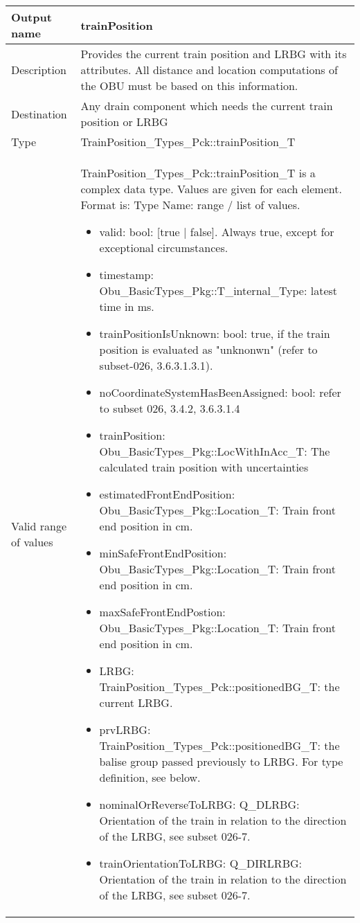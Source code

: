 \begin{longtable}{p{}p{}}
\toprule
Output name				& trainPosition \\
\midrule
Description				& Provides the current train position and LRBG with its attributes. All distance and location computations of the OBU must be based on this information.   \\
\midrule
Destination				& Any drain component which needs the current train position or  LRBG \\ 
\midrule
Type					& TrainPosition\_Types\_Pck::trainPosition\_T \\  
\midrule
Valid range of values	& TrainPosition\_Types\_Pck::trainPosition\_T is a complex data type. Values are given for each element. Format is: Type Name: range / list of values.
\begin{itemize}
\item valid: bool: [true | false]. Always true, except for exceptional circumstances.
\item timestamp: Obu\_BasicTypes\_Pkg::T\_internal\_Type: latest time in ms. 
\item trainPositionIsUnknown: bool: true, if the train position is evaluated as "unknonwn" (refer to subset-026, 3.6.3.1.3.1). 
\item noCoordinateSystemHasBeenAssigned: bool: refer to subset 026, 3.4.2, 3.6.3.1.4
\item trainPosition: Obu\_BasicTypes\_Pkg::LocWithInAcc\_T: The calculated train position with uncertainties
\item estimatedFrontEndPosition: Obu\_BasicTypes\_Pkg::Location\_T: Train front end position in cm.
\item minSafeFrontEndPosition: Obu\_BasicTypes\_Pkg::Location\_T: Train front end position in cm.
\item maxSafeFrontEndPostion: Obu\_BasicTypes\_Pkg::Location\_T: Train front end position in cm.
\item LRBG: TrainPosition\_Types\_Pck::positionedBG\_T: the current LRBG. 
\item prvLRBG: TrainPosition\_Types\_Pck::positionedBG\_T: the balise group passed previously to LRBG. For type definition, see below.
\item nominalOrReverseToLRBG: Q\_DLRBG: Orientation of the train in relation to the direction of the LRBG, see subset 026-7.
\item trainOrientationToLRBG: Q\_DIRLRBG: Orientation of the train in relation to the direction of the LRBG, see subset 026-7.

\end{itemize}
\end{longtable}
